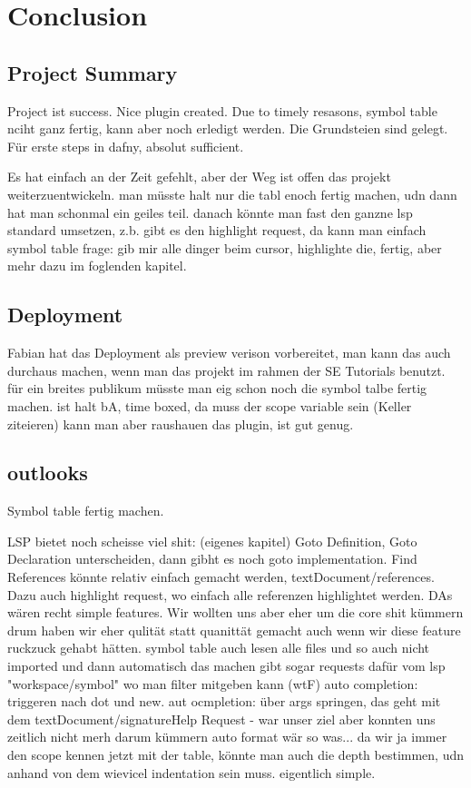 \section{Conclusion}


\subsection{Project Summary}
Project ist success. Nice plugin created. Due to timely resasons, symbol table nciht ganz fertig, kann aber noch erledigt werden. Die Grundsteien sind gelegt.
Für erste steps in dafny, absolut sufficient.

Es hat einfach an der Zeit gefehlt, aber der Weg ist offen das projekt weiterzuentwickeln. man müsste halt nur die tabl enoch fertig machen, udn dann hat man schonmal ein geiles teil.
danach könnte man fast den ganzne lsp standard umsetzen, z.b. gibt es den highlight request, da kann man einfach symbol table frage: gib mir alle dinger beim cursor, highlighte die, fertig, aber mehr dazu im foglenden kapitel.

\subsection{Deployment}
Fabian hat das Deployment als preview verison vorbereitet, man kann das auch durchaus machen, wenn man das projekt im rahmen der SE Tutorials benutzt.
für ein breites publikum müsste man eig schon noch die symbol talbe fertig machen.
ist halt bA, time boxed, da muss der scope variable sein (Keller ziteieren)
kann man aber raushauen das plugin, ist gut genug.

\subsection{outlooks}
Symbol table fertig machen.


LSP bietet noch scheisse viel shit: (eigenes kapitel)
Goto Definition, Goto Declaration unterscheiden, dann gibht es noch goto implementation.
Find References könnte relativ einfach gemacht werden, textDocument/references. Dazu auch highlight request, wo einfach alle referenzen highlightet werden. DAs wären recht simple features. Wir wollten uns aber eher um die core shit kümmern drum haben wir eher qulität statt quanittät gemacht auch wenn wir diese feature ruckzuck gehabt hätten.
symbol table auch lesen alle files und so auch nicht imported und dann automatisch das machen gibt sogar requests dafür vom lsp "workspace/symbol" wo man filter mitgeben kann (wtF)
auto completion: triggeren nach dot und new.
aut ocmpletion: über args springen, das geht mit dem textDocument/signatureHelp Request - war unser ziel aber konnten uns zeitlich nicht merh darum kümmern
auto format wär so was... da wir ja immer den scope kennen jetzt mit der table, könnte man auch die depth  bestimmen, udn anhand von dem wievicel indentation sein muss. eigentlich simple.


